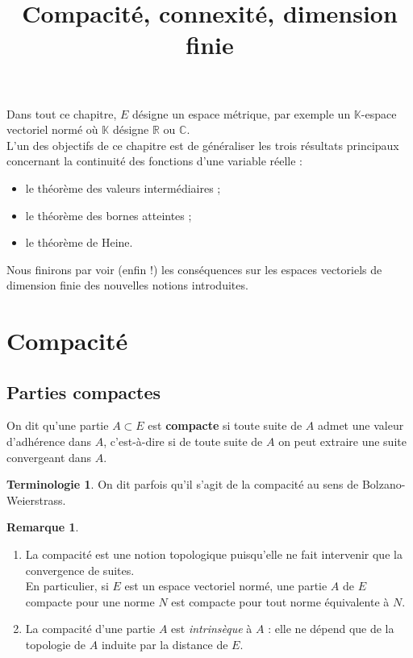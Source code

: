 \documentclass[french]{article}
\title{Compacité, connexité, dimension finie}
\date{}
\newcommand{\R}{\mathbb{R}}
\newcommand{\C}{\mathbb{C}}
\newcommand{\K}{\mathbb{K}}
\theoremstyle{plain}
\theoremstyle{definition}
\newtheorem*{rmq}{Remarque}
\newtheorem*{terminologie}{Terminologie}
\theoremstyle{remark}
\begin{document}
\tableofcontents

\newpage
\maketitle

Dans tout ce chapitre, $E$ désigne un espace métrique, par exemple un $\K$-espace vectoriel normé où $\K$ désigne $\R$ ou $\C$.\\
L'un des objectifs de ce chapitre est de généraliser les trois résultats principaux concernant la continuité des fonctions d'une variable réelle :
\begin{itemize}
	\item le théorème des valeurs intermédiaires ;
	\item le théorème des bornes atteintes ;
	\item le théorème de Heine.
\end{itemize}
Nous finirons par voir (enfin !) les conséquences sur les espaces vectoriels de dimension finie des nouvelles notions introduites.

\section{Compacité}%

\subsection{Parties compactes}%

\begin{dfn}
	On dit qu'une partie $A\subset E$ est \textbf{compacte} si toute suite de $A$ admet une valeur d'adhérence dans $A$, c'est-à-dire si de toute suite de $A$ on peut extraire une suite convergeant dans $A$.
\end{dfn}

\begin{terminologie}
	On dit parfois qu'il s'agit de la compacité au sens de Bolzano-Weierstrass.
\end{terminologie}

\begin{rmq}
	\begin{enumerate}
		\item La compacité est une notion topologique puisqu'elle ne fait intervenir que la convergence de suites. \\
		En particulier, si $E$ est un espace vectoriel normé, une partie $A$ de $E$ compacte pour une norme $N$ est compacte pour tout norme équivalente à $N$.
		\item La compacité d'une partie $A$ est \textit{intrinsèque} à $A$ : elle ne dépend que de la topologie de $A$ induite par la distance de $E$.
	\end{enumerate}
\end{rmq}
\end{document}
